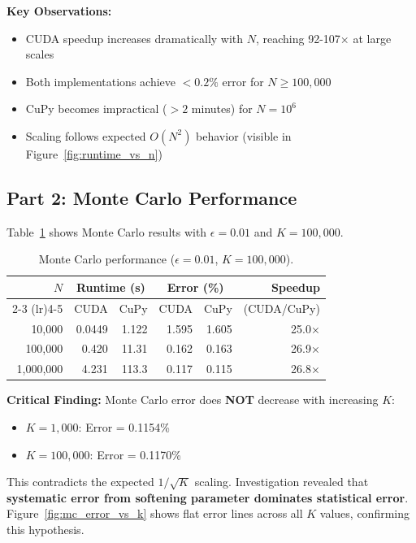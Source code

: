 \documentclass[11pt,a4paper]{article}
\begin{document}
\textbf{Key Observations:}
\begin{itemize}
\item CUDA speedup increases dramatically with $N$, reaching 92-107× at large scales
\item Both implementations achieve $<0.2\%$ error for $N \geq 100{,}000$
\item CuPy becomes impractical ($>2$ minutes) for $N=10^6$
\item Scaling follows expected $O(N^2)$ behavior (visible in Figure~\ref{fig:runtime_vs_n})
\end{itemize}

\subsection{Part 2: Monte Carlo Performance}

Table~\ref{table:mc_results} shows Monte Carlo results with $\epsilon=0.01$ and $K=100{,}000$.

\begin{table}[H]
  \centering
  \caption{Monte Carlo performance ($\epsilon=0.01$, $K=100{,}000$).}
  \label{table:mc_results}
  \begin{tabular}{rrrrrr}
    \toprule
    $N$ & \multicolumn{2}{c}{Runtime (s)} & \multicolumn{2}{c}{Error (\%)} & Speedup \\
    \cmidrule(lr){2-3} \cmidrule(lr){4-5}
    & CUDA & CuPy & CUDA & CuPy & (CUDA/CuPy) \\
    \midrule
    10,000 & 0.0449 & 1.122 & 1.595 & 1.605 & 25.0× \\
    100,000 & 0.420 & 11.31 & 0.162 & 0.163 & 26.9× \\
    1,000,000 & 4.231 & 113.3 & 0.117 & 0.115 & 26.8× \\
    \bottomrule
  \end{tabular}
\end{table}

\textbf{Critical Finding:} Monte Carlo error does \textbf{NOT} decrease with increasing $K$:
\begin{itemize}
\item $K=1{,}000$: Error = 0.1154\%
\item $K=100{,}000$: Error = 0.1170\%
\end{itemize}

This contradicts the expected $1/\sqrt{K}$ scaling. Investigation revealed that \textbf{systematic error from softening parameter dominates statistical error}. Figure~\ref{fig:mc_error_vs_k} shows flat error lines across all $K$ values, confirming this hypothesis.
\end{document}
